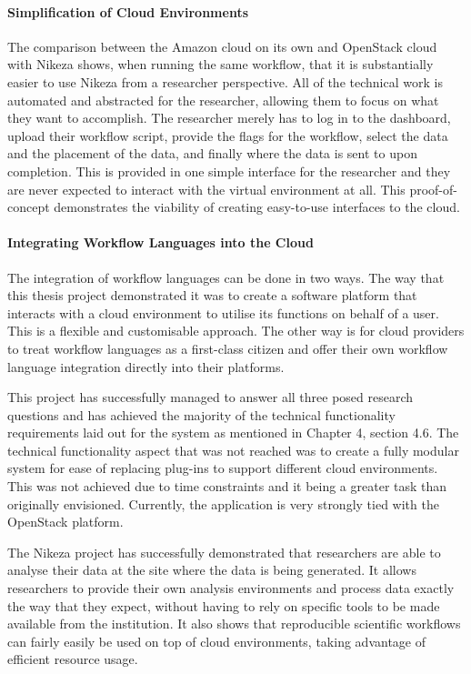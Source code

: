 \paragraph{Simplification of Cloud Environments}
The comparison between the Amazon cloud on its own and OpenStack cloud with Nikeza shows, when running the same workflow, that it is substantially easier to use Nikeza from a researcher perspective. All of the technical work is automated and abstracted for the researcher, allowing them to focus on what they want to accomplish. The researcher merely has to log in to the dashboard, upload their workflow script, provide the flags for the workflow, select the data and the placement of the data, and finally where the data is sent to upon completion. This is provided in one simple interface for the researcher and they are never expected to interact with the virtual environment at all. This proof-of-concept demonstrates the viability of creating easy-to-use interfaces to the cloud.

\paragraph{Integrating Workflow Languages into the Cloud}
The integration of workflow languages can be done in two ways. The way that this thesis project demonstrated it was to create a software platform that interacts with a cloud environment to utilise its functions on behalf of a user. This is a flexible and customisable approach. The other way is for cloud providers to treat workflow languages as a first-class citizen and offer their own workflow language integration directly into their platforms.

This project has successfully managed to answer all three posed research questions and has achieved the majority of the technical functionality requirements laid out for the system as mentioned in Chapter 4, section 4.6. The technical functionality aspect that was not reached was to create a fully modular system for ease of replacing plug-ins to support different cloud environments. This was not achieved due to time constraints and it being a greater task than originally envisioned. Currently, the application is very strongly tied with the OpenStack platform.

The Nikeza project has successfully demonstrated that researchers are able to analyse their data at the site where the data is being generated. It allows researchers to provide their own analysis environments and process data exactly the way that they expect, without having to rely on specific tools to be made available from the institution. It also shows that reproducible scientific workflows can fairly easily be used on top of cloud environments, taking advantage of efficient resource usage.

